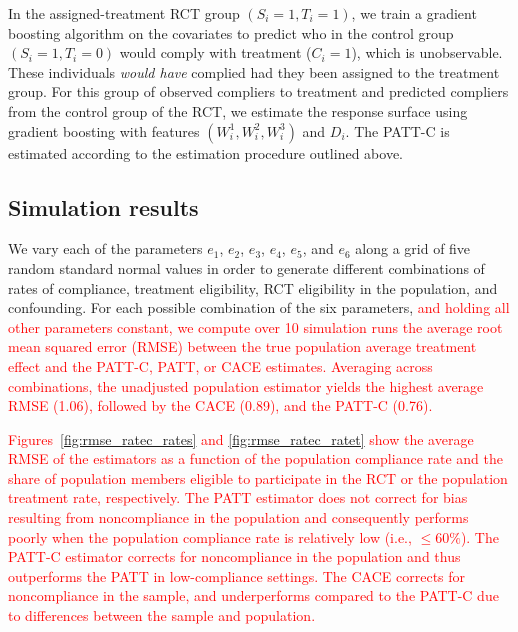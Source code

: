\documentclass[hidelinks,12pt]{article}
\begin{document}
In the assigned-treatment RCT group $(S_i = 1, T_i = 1)$, we train a gradient boosting algorithm \citep{friedman2001greedy} on the covariates to predict who in the control group $(S_i = 1, T_i = 0)$ would comply with treatment ($C_i=1$), which is unobservable. These individuals \textit{would have} complied had they been assigned to the treatment group. For this group of observed compliers to treatment and predicted compliers from the control group of the RCT, we estimate the response surface using gradient boosting with features $(W^{1}_i, W^{2}_i, W^{3}_i)$ and $D_i$. The PATT-C is estimated according to the estimation procedure outlined above.

\subsection{Simulation results}\label{sim-results}

We vary each of the parameters $e_1$, $e_2$, $e_3$, $e_4$, $e_5$, and $e_6$ along a grid of five random standard normal values in order to generate different combinations of rates of compliance, treatment eligibility, RCT eligibility in the population, and confounding. For each possible combination of the six parameters, \textcolor{red}{and holding all other parameters constant, we compute over 10 simulation runs the average root mean squared error (RMSE) between the true population average treatment effect and the PATT-C, PATT, or CACE estimates. Averaging across combinations, the unadjusted population estimator yields the highest average RMSE (1.06), followed by the CACE (0.89), and the PATT-C (0.76). } 

\textcolor{red}{Figures~\ref{fig:rmse_ratec_rates} and \ref{fig:rmse_ratec_ratet} show the average RMSE of the estimators as a function of the population compliance rate and the share of population members eligible to participate in the RCT or the population treatment rate, respectively. The PATT estimator does not correct for bias resulting from noncompliance in the population and consequently performs poorly when the population compliance rate is relatively low (i.e., $\leq 60\%$). The PATT-C estimator corrects for noncompliance in the population and thus outperforms the PATT in low-compliance settings. The CACE corrects for noncompliance in the sample, and underperforms compared to the PATT-C due to differences between the sample and population.}
\end{document}
